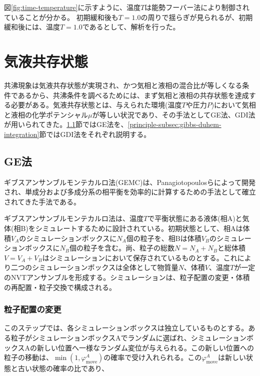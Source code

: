 \documentclass[titlepage]{jsreport}
\begin{document}
\newpage
図\ref{fig:time-temperature}に示すように、温度$T$は能勢フーバー法により制御されていることが分かる。
初期緩和後も$T=1.0$の周りで揺らぎが見られるが、初期緩和後には、温度$T=1.0$であるとして、解析を行った。


\section{気液共存状態} \label{principle-sec:gas-liquid-coexistence}
共沸現象は気液共存状態が実現され、かつ気相と液相の混合比が等しくなる条件であるから、共沸条件を調べるためには、まず気相と液相の共存状態を達成する必要がある。気液共存状態とは、与えられた環境(温度$T$や圧力$P$)において気相と液相の化学ポテンシャル$\mu$が等しい状況であり、その手法としてGE法、GDI法が用いられてきた。\ref{principle-subsec:gibbs-ensemble}節ではGE法を、\ref{principle-subsec:gibbs-duhem-integration}節ではGDI法をそれぞれ説明する。

\subsection{GE法} \label{principle-subsec:gibbs-ensemble}
ギブスアンサンブルモンテカルロ法(GEMC)は、Panagiotopoulosらによって開発され\cite{gibbs-ensemble-panagiotopoulos-1,gibbs-ensemble-panagiotopoulos-2}、単成分および多成分系の相平衡を効率的に計算するための手法として確立されてきた手法である\cite{gibbs-ensemble-phase-equilibrium-1,gibbs-ensemble-phase-equilibrium-2}。

ギブスアンサンブルモンテカルロ法は、温度$T$で平衡状態にある液体(相A)と気体(相B)をシミュレートするために設計されている\cite{gibbs-ensemble-panagiotopoulos-2}。初期状態として、相Aは体積$V_A$のシミュレーションボックスに$N_A$個の粒子を、相Bは体積$V_B$のシミュレーションボックスに$N_B$個の粒子を含む。尚、粒子の総数$N=N_A+N_B$と総体積$V=V_A+V_B$はシミュレーションにおいて保存されているものとする。これにより二つのシミュレーションボックスは全体として物質量$N$、体積$V$、温度$T$が一定のNVTアンサンブルを形成する。シミュレーションは、粒子配置の変更・体積の再配置・粒子交換で構成される。

\subsubsection{粒子配置の変更}\label{principle-subsubsec:particle-displacement}
このステップでは、各シミュレーションボックスは独立しているものとする。ある粒子がシミュレーションボックスAでランダムに選ばれ、シミュレーションボックスAの新しい位置へ一様なランダム変位が与えられる。この新しい位置への粒子の移動は、$\min(1, \varphi_\mathrm{move}^A)$の確率で受け入れられる。この$\varphi_\mathrm{move}^A$は新しい状態と古い状態の確率の比であり、
\end{document}
